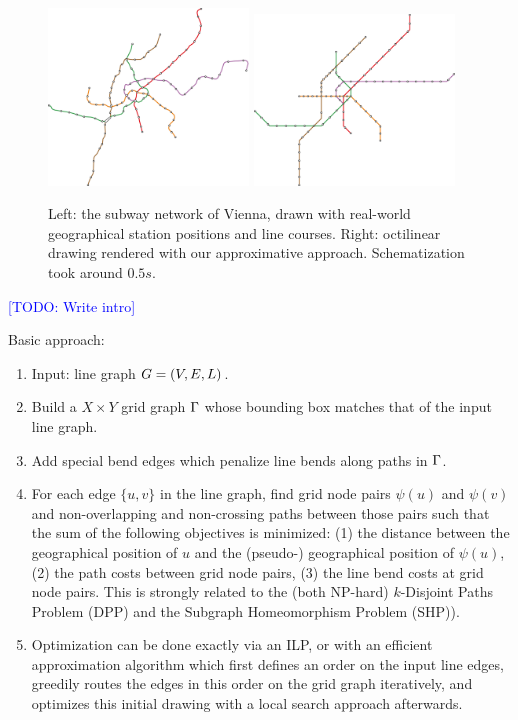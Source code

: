 \documentclass[sigconf]{acmart}
\newcommand\TODO[1]{\textcolor{blue}{\small [TODO: #1]}}
\begin{document}
\begin{figure}[t]
  \centering
	\includegraphics[width=0.474\textwidth]{figures/octi_input.pdf}
	\includegraphics[width=0.474\textwidth]{figures/octi.pdf}
	\caption{Left: the subway network of Vienna, drawn with real-world geographical station positions and line courses. Right: octilinear drawing rendered with our approximative approach. Schematization took around $0.5 s$.}
	\label{FIG:examplewien}
\end{figure}

\TODO{Write intro}

Basic approach:

\begin{enumerate}
	\item Input: line graph $G = (V, E, L)$.
	\item Build a $X\times Y$ grid graph $\Gamma$ whose bounding box matches that of the input line graph.
	\item Add special bend edges which penalize line bends along paths in $\Gamma$.
	\item For each edge $\{u, v\}$ in the line graph, find grid node pairs $\psi(u)$ and $\psi(v)$ and non-overlapping and non-crossing paths between those pairs such that the sum of the following objectives is minimized: (1) the distance between the geographical position of $u$ and the (pseudo-) geographical position of $\psi(u)$, (2) the path costs between grid node pairs, (3) the line bend costs at grid node pairs. This is strongly related to the (both NP-hard) $k$-Disjoint Paths Problem (DPP) and the Subgraph Homeomorphism Problem (SHP)).
	\item Optimization can be done exactly via an ILP, or with an efficient approximation algorithm which first defines an order on the input line edges, greedily routes the edges in this order on the grid graph iteratively, and optimizes this initial drawing with a local search approach afterwards.
\end{enumerate}
\end{document}
